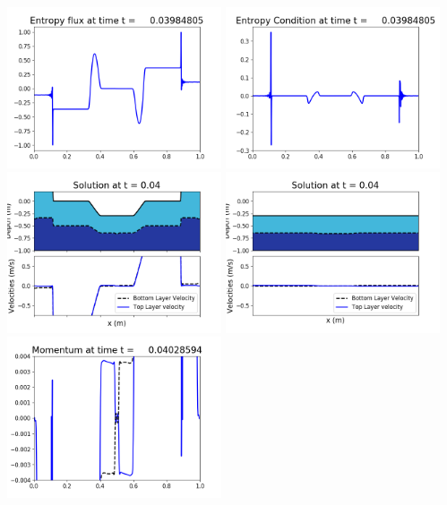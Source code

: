\documentclass[11pt]{article}
\begin{document}
\includegraphics[width=0.475\textwidth]{frame0092fig1008.png}
\vskip 10pt 
\includegraphics[width=0.475\textwidth]{frame0092fig1009.png}
\vskip 10pt 
\includegraphics[width=0.475\textwidth]{frame0093fig1001.png}
\includegraphics[width=0.475\textwidth]{frame0093fig1002.png}
\vskip 10pt 
\includegraphics[width=0.475\textwidth]{frame0093fig1003.png}
\end{document}
